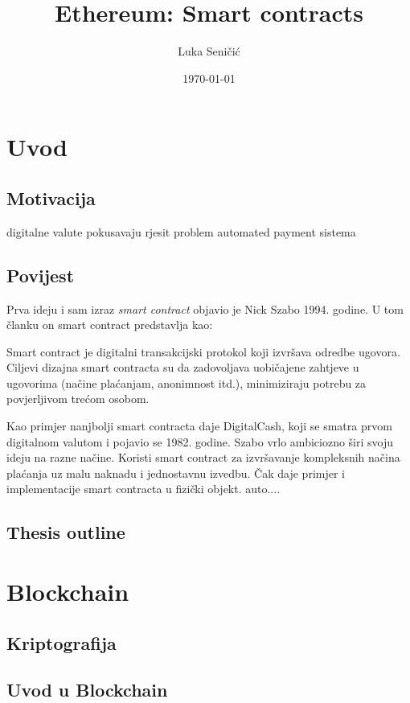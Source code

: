 \documentclass[12pt]{report}
\title{Ethereum: Smart contracts}
\author{Luka Seničić}
\date{\today}
\begin{document}
\maketitle

\tableofcontents

\chapter{Uvod}
\section{Motivacija}
digitalne valute pokusavaju rjesit problem automated payment sistema

\section{Povijest}
Prva ideju i sam izraz \emph{smart contract} objavio je Nick Szabo 1994. godine\cite{smart_contract_idea}. U tom članku on smart contract predstavlja kao:
\begin{definicija}
Smart contract je digitalni transakcijski protokol koji izvršava odredbe ugovora. Ciljevi dizajna smart contracta su da zadovoljava uobičajene zahtjeve u ugovorima (načine plaćanjam, anonimnost itd.), minimiziraju potrebu za povjerljivom trećom osobom.
\end{definicija}
Kao primjer nanjbolji smart contracta daje DigitalCash, koji se smatra prvom digitalnom valutom i pojavio se 1982. godine\cite{digi_cash}. Szabo vrlo ambiciozno širi svoju ideju na razne načine. Koristi smart contract za izvršavanje kompleksnih načina plaćanja uz malu naknadu i jednostavnu izvedbu. Čak daje primjer i implementacije smart contracta u fizički objekt. auto....


\section{Thesis outline}

\chapter{Blockchain}

\section{Kriptografija}

\section{Uvod u Blockchain}
\end{document}
